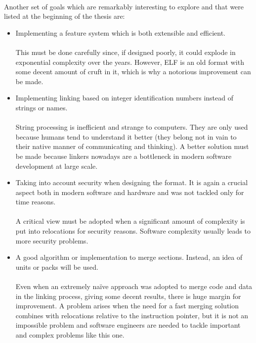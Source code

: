 \documentclass[12pt]{article}
\begin{document}
	\paragraph{}Another set of goals which are remarkably interesting to explore and that were listed at the beginning of the thesis are:
	
	\begin{itemize}
		\item Implementing a feature system which is both extensible and efficient.
		\paragraph{}This must be done carefully since, if designed poorly, it could explode in exponential complexity over the years. However, \acrshort{ELF} is an old format with some decent amount of cruft in it, which is why a notorious improvement can be made.
		\item Implementing linking based on integer identification numbers instead of strings or names.
		\paragraph{}String processing is inefficient and strange to computers. They are only used because humans tend to understand it better (they belong not in vain to their native manner of communicating and thinking). A better solution must be made because linkers nowadays are a bottleneck in modern software development at large scale\cite{ganea}.
		\item Taking into account security when designing the format. It is again a crucial aspect both in modern software and hardware and was not tackled only for time reasons.
		\paragraph{}A critical view must be adopted when a significant amount of complexity is put into relocations for security reasons. Software complexity usually leads to more security problems.
		\item A good algorithm or implementation to merge sections. Instead, an idea of units or packs will be used.
		\paragraph{}Even when an extremely naïve approach was adopted to merge code and data in the linking process, giving some decent results, there is huge margin for improvement. A problem arises when the need for a fast merging solution combines with relocations relative to the instruction pointer, but it is not an impossible problem and software engineers are needed to tackle important and complex problems like this one.
	\end{itemize}
	\newpage
	\printglossary[type=acronym]
	\newpage
	\printglossary[type=main]
\end{document}
